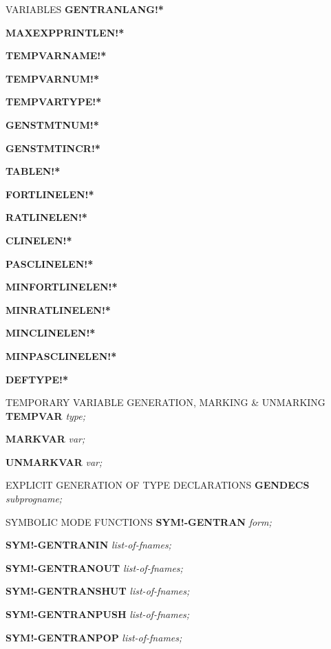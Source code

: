 \begin{describe}{VARIABLES}
{\bf GENTRANLANG!*} 

{\bf MAXEXPPRINTLEN!*} 

{\bf TEMPVARNAME!*} 

{\bf TEMPVARNUM!*} 

{\bf TEMPVARTYPE!*} 

{\bf GENSTMTNUM!*} 

{\bf GENSTMTINCR!*} 

{\bf TABLEN!*} 

{\bf FORTLINELEN!*} 

{\bf RATLINELEN!*} 

{\bf CLINELEN!*} 

{\bf PASCLINELEN!*} 

{\bf MINFORTLINELEN!*} 

{\bf MINRATLINELEN!*} 

{\bf MINCLINELEN!*} 

{\bf MINPASCLINELEN!*} 

{\bf DEFTYPE!*}
\end{describe}

\begin{describe}{TEMPORARY VARIABLE GENERATION, MARKING \& UNMARKING}
{\bf TEMPVAR} {\it type;}

{\bf MARKVAR} {\it var;}

{\bf UNMARKVAR} {\it var;}
\end{describe}

\begin{describe}{EXPLICIT GENERATION OF TYPE DECLARATIONS}
{\bf GENDECS} {\it subprogname;}
\end{describe}

\begin{describe}{SYMBOLIC MODE FUNCTIONS}
{\bf SYM!-GENTRAN} {\it form;}

{\bf SYM!-GENTRANIN} {\it list-of-fnames;}

{\bf SYM!-GENTRANOUT} {\it list-of-fnames;}

{\bf SYM!-GENTRANSHUT} {\it list-of-fnames;}

{\bf SYM!-GENTRANPUSH} {\it list-of-fnames;}

{\bf SYM!-GENTRANPOP} {\it list-of-fnames;}
\end{describe}

